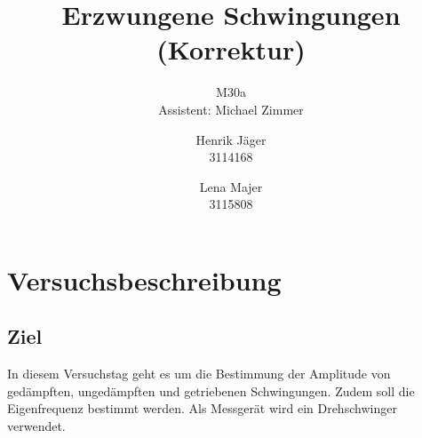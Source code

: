 \documentclass[12pt,a4paper,]{scrreprt}
\begin{document}
	\title{Erzwungene Schwingungen\\(Korrektur)} 
	\author{Henrik Jäger \\ 3114168 \and Lena Majer \\ 3115808}
	\subtitle{M30a \\  Assistent: Michael Zimmer}
	\subject{Physikalisches Praktikum I}
	\publishers{Universität Stuttgart}

	\maketitle%

	\tableofcontents   %

	\pagebreak
    
	\chapter{Versuchsbeschreibung}
  
    
		\section{Ziel}
			In diesem Versuchstag geht es um die Bestimmung der Amplitude von gedämpften, ungedämpften und getriebenen Schwingungen. Zudem soll die Eigenfrequenz bestimmt werden. Als Messgerät wird ein Drehschwinger verwendet.
		
\end{document}

